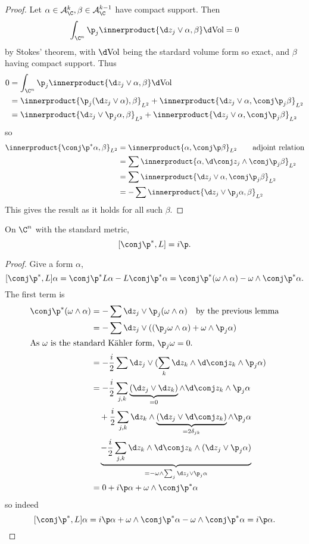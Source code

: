 \documentclass[a4paper]{article}
\newcommand{\w}{\wedge} %
\newcommand*{\ip}{\innerproduct}
\begin{document}
\begin{proof}
  Let \(\alpha \in \mathcal A_\C^k, \beta \in \mathcal A_\C^{k - 1}\) have compact support. Then
  \[
    \int_{\C^n} \p_j \ip{\d z_j \vee \alpha, \beta} \d \text{Vol} = 0
  \]
  by Stokes' theorem, with \(\d \text{Vol}\) being the stardard volume form so exact, and \(\beta\) having compact support. Thus
  \begin{align*}
    0
    &= \int_{\C^n} \p_j \ip{\d z_j \vee \alpha, \beta} \d \text{Vol} \\
    &= \ip{\p_j (\d z_j \vee \alpha), \beta}_{L^2} + \ip{\d z_j \vee \alpha, \conj \p_j \beta}_{L^2} \\
    &= \ip{\d z_j \vee \p_j \alpha, \beta}_{L^2} + \ip{\d z_j \vee \alpha, \conj \p_j \beta}_{L^2}
  \end{align*}
  so
  \begin{align*}
    \ip{\conj \p^* \alpha, \beta}_{L^2}
    &= \ip{\alpha, \conj \p \beta}_{L^2} \qquad \text{adjoint relation} \\
    &= \sum \ip{\alpha, \d \conj z_j \w \conj \p_j \beta}_{L^2} \\
    &= \sum \ip{\d z_j \vee \alpha, \conj \p_j \beta}_{L^2} \\
    &= - \sum \ip{\d z_j \vee \p_j \alpha, \beta}_{L^2}
  \end{align*}
  This gives the result as it holds for all such \(\beta\).
\end{proof}

\begin{lemma}
  On \(\C^n\) with the standard metric,
  \[
    [\conj \p^*, L] = i\p.
  \]
\end{lemma}

\begin{proof}
  Give a form \(\alpha\),
  \[
    [\conj \p^*, L] \alpha
    = \conj \p^* L \alpha - L \conj \p^* \alpha
    = \conj \p^* (\omega \w \alpha) - \omega \w \conj \p^* \alpha.
  \]
  The first term is
  \begin{align*}
    \conj \p^* (\omega \w \alpha)
    &= - \sum \d z_j \vee \p_j (\omega \w \alpha) \quad \text{by the previous lemma} \\
    &= - \sum \d z_j \vee ((\p_j \omega \w \alpha) + \omega \w \p_j \alpha) \\
    \intertext{As \(\omega\) is the standard Kähler form, \(\p_j \omega = 0\).}
    &= - \frac{i}{2} \sum \d z_j \vee (\sum_k \d z_k \w \d \conj z_k \w \p_j \alpha) \\
    &= - \frac{i}{2} \sum_{j, k} \underbrace{(\d z_j \vee \d z_k)}_{= 0} \w \d \conj z_k \w \p_j \alpha \\
    &\quad + \frac{i}{2} \sum_{j, k} \d z_k \w \underbrace{(\d z_j \vee \d \conj z_k)}_{= 2\delta_{jk}} \w \p_j \alpha \\
    &\quad \underbrace{- \frac{i}{2} \sum_{j, k} \d z_k \w \d \conj z_k \w (\d z_j \vee \p_j \alpha)}_{= - \omega \w \sum_j \d z_j \vee \p_j \alpha} \\
    &= 0 + i \p \alpha + \omega \w \conj \p^* \alpha
  \end{align*}
  so indeed
  \[
    [\conj \p^*, L] \alpha
    = i \p \alpha + \omega \w \conj \p^* \alpha - \omega \w \conj \p^* \alpha
    = i \p \alpha.
  \]
\end{proof}
\end{document}
